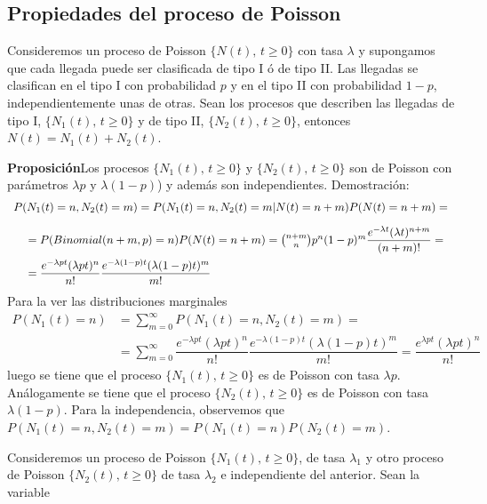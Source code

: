 \subsection{Propiedades del proceso de Poisson}
Consideremos un proceso de Poisson $\{N(t),\,t\geq 0\}$ con tasa
$\lambda$ y supongamos que cada llegada puede ser clasificada de
tipo I \'{o} de tipo II. Las llegadas se clasifican en el tipo I con
probabilidad $p$ y en el tipo II con probabilidad $1-p$,
independientemente unas de otras. Sean los procesos que describen
las llegadas de tipo I, $\{N_1(t),\,t\geq 0\}$ y de tipo II,
$\{N_2(t),\,t\geq 0\}$, entonces $N(t)=N_1(t)+N_2(t)$.
\par
{\bf Proposici\'{o}n}\hfill\break Los procesos $\{N_1(t),\,t\geq 0\}$
y $\{N_2(t),\,t\geq 0\}$ son de Poisson con par\'{a}metros $\lambda
p$ y $\lambda (1-p)$) y adem\'{a}s son independientes. \hfill\break
Demostraci\'{o}n:
\[
\begin{array}{l}
P(N_1(t)=n, N_2(t)=m)=%
P(N_1(t)=n, N_2(t)=m|N(t)=n+m
)P(N(t)=n+m)=\\[10pt]
\hbox{}\hspace{10pt}=P(Binomial(n+m,p)=n)P(N(t)=n+m)={n+m \choose
n}p^n(1-p)^m \dfrac{e^{-\lambda t}(\lambda
t)^{n+m}}{(n+m)!}=\\[10pt]
\hbox{}\hspace{10pt}=\dfrac{e^{-\lambda pt}(\lambda
pt)^{n}}{n!}\dfrac{e^{-\lambda (1-p)t}(\lambda (1-p)t)^{m}}{m!}
\end{array}
\]
Para la ver las distribuciones marginales
\[
\begin{array}{ll}
P(N_1(t)=n)&=\displaystyle\sum_{m=0}^\infty P(N_1(t)=n, N_2(t)=m)=\\[10pt]
&=\displaystyle\sum_{m=0}^\infty \dfrac{e^{-\lambda pt}(\lambda
pt)^{n}}{n!}\dfrac{e^{-\lambda (1-p)t}(\lambda (1-p)t)^{m}}{m!}=
\dfrac{e^{\lambda pt}(\lambda pt)^{n}}{n!}
\end{array}
\]
luego se tiene que el proceso $\{N_1(t),\,t\geq 0\}$ es de Poisson
con tasa $\lambda p$. An\'{a}logamente se tiene que el proceso
$\{N_2(t),\,t\geq 0\}$ es de Poisson con tasa $\lambda (1-p)$.
Para la independencia, observemos que
$P(N_1(t)=n,N_2(t)=m)=P(N_1(t)=n)P(N_2(t)=m)$.
\par
Consideremos un proceso de Poisson $\{N_1(t),\,t\geq 0\}$, de tasa
$\lambda_1$ y otro proceso de Poisson $\{N_2(t),\,t\geq 0\}$ de
tasa $\lambda_2$ e independiente del anterior. Sean la variable
